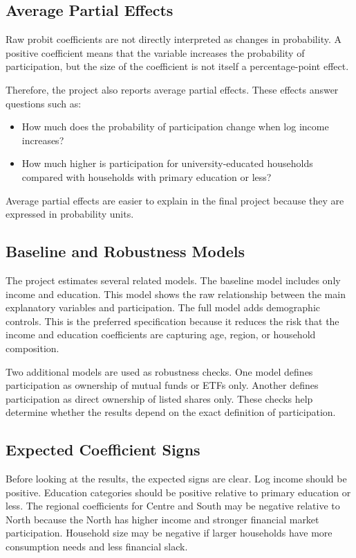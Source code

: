 \documentclass[12pt]{article}
\begin{document}
\subsection{Average Partial Effects}

Raw probit coefficients are not directly interpreted as changes in probability. A positive coefficient means that the variable increases the probability of participation, but the size of the coefficient is not itself a percentage-point effect.

Therefore, the project also reports average partial effects. These effects answer questions such as:

\begin{itemize}[leftmargin=*]
    \item How much does the probability of participation change when log income increases?
    \item How much higher is participation for university-educated households compared with households with primary education or less?
\end{itemize}

Average partial effects are easier to explain in the final project because they are expressed in probability units.

\subsection{Baseline and Robustness Models}

The project estimates several related models. The baseline model includes only income and education. This model shows the raw relationship between the main explanatory variables and participation. The full model adds demographic controls. This is the preferred specification because it reduces the risk that the income and education coefficients are capturing age, region, or household composition.

Two additional models are used as robustness checks. One model defines participation as ownership of mutual funds or ETFs only. Another defines participation as direct ownership of listed shares only. These checks help determine whether the results depend on the exact definition of participation.

\subsection{Expected Coefficient Signs}

Before looking at the results, the expected signs are clear. Log income should be positive. Education categories should be positive relative to primary education or less. The regional coefficients for Centre and South may be negative relative to North because the North has higher income and stronger financial market participation. Household size may be negative if larger households have more consumption needs and less financial slack.
\end{document}
